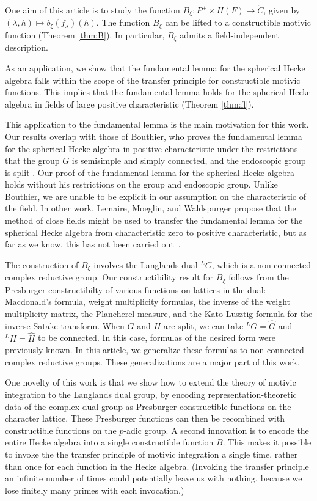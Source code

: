 One aim of this article is to study the function $B_\xi:P^+\times H(F)\to \ring{C}$, given by
$(\lambda,h)\mapsto b_\xi(f_\lambda)(h)$.   The function $B_\xi$ can be lifted to a constructible motivic
function (Theorem \ref{thm:B}).   In particular, $B_\xi$ admits a field-independent description.  

As an application, we show that the fundamental lemma for the spherical Hecke algebra falls within
the scope of the transfer principle for constructible motivic functions.
This implies that the fundamental lemma holds for the spherical Hecke algebra in fields of large positive
characteristic (Theorem \ref{thm:fl}).

This application to the fundamental lemma is the main motivation for this work.  Our results overlap with
those of Bouthier, who proves the fundamental lemma for the spherical Hecke algebra in positive
characteristic under the restrictions that the group $G$ is semisimple and simply connected, 
and the endoscopic group is split \cite[Theorem~0.2]{bouthier}.  Our proof of the fundamental lemma for the
spherical Hecke algebra holds without his restrictions on the group and endoscopic group.
Unlike Bouthier, we are unable to be explicit in our assumption
on the characteristic of the field.  In other work,
Lemaire, Moeglin, and Waldspurger propose that the method of close fields might be used to transfer the
fundamental lemma for the spherical Hecke algebra from characteristic zero to positive characteristic, but as far as we know, 
this has not been
carried out~\cite[\S1.3]{LMW}.

The construction of $B_\xi$ involves the Langlands dual ${}^LG$, which is a non-connected complex reductive group.
Our constructibility result for $B_\xi$ follows from the  Presburger constructibilty of various
functions on lattices in the dual:  Macdonald's formula, weight multiplicity formulas, the inverse of the weight multiplicity matrix,
the Plancherel measure,
and the Kato-Lusztig formula for the inverse Satake transform.  
When $G$ and $H$ are split, we can take ${}^LG = \hat G$ and ${}^LH=\hat H$ to be connected.  In this case,
formulas of the desired form were previously known.  In this article, we
generalize these formulas to non-connected complex reductive groups.
These generalizations are a major part of this work.

One novelty of this work is that we show how to extend the theory of motivic integration to the Langlands
dual group, by encoding representation-theoretic data of the complex dual group as Presburger constructible functions on the character lattice. These
Presburger functions can then be recombined with constructible functions on the $p$-adic group.  A second innovation is
to encode the entire Hecke algebra into a single constructible function $B$.  This makes it possible to invoke the the transfer
principle of motivic integration a single time, rather than once for each function in the Hecke algebra.  (Invoking the transfer principle
an infinite number of times could potentially leave us with nothing, because we lose finitely many primes with each invocation.)

